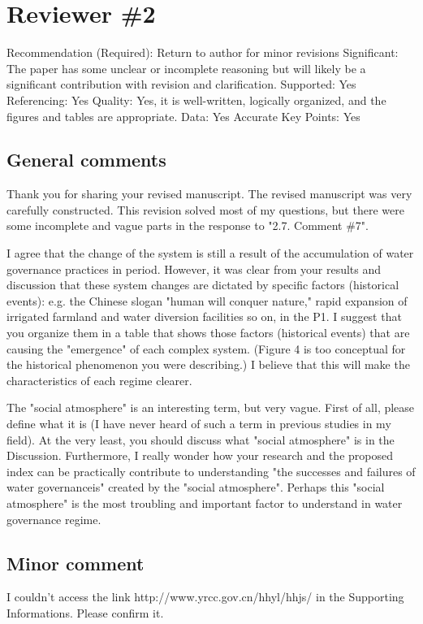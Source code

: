 \section{Reviewer \#2}\label{reviewer_2}

Recommendation (Required): Return to author for minor revisions
Significant: The paper has some unclear or incomplete reasoning but will likely be a significant contribution with revision and clarification.
Supported: Yes
Referencing: Yes
Quality: Yes, it is well-written, logically organized, and the figures and tables are appropriate.
Data: Yes
Accurate Key Points: Yes

\subsection*{General comments}

Thank you for sharing your revised manuscript. The revised manuscript was very carefully constructed. This revision solved most of my questions, but there were some incomplete and vague parts in the response to "2.7. Comment \#7".

I agree that the change of the system is still a result of the accumulation of water governance practices in period. However, it was clear from your results and discussion that these system changes are dictated by specific factors (historical events): e.g. the Chinese slogan "human will conquer nature," rapid expansion of irrigated farmland and water diversion facilities so on, in the P1. I suggest that you organize them in a table that shows those factors (historical events) that are causing the "emergence" of each complex system. (Figure 4 is too conceptual for the historical phenomenon you were describing.) I believe that this will make the characteristics of each regime clearer.

The "social atmosphere" is an interesting term, but very vague. First of all, please define what it is (I have never heard of such a term in previous studies in my field). At the very least, you should discuss what "social atmosphere" is in the Discussion. Furthermore, I really wonder how your research and the proposed index can be practically contribute to understanding "the successes and failures of water governanceis" created by the "social atmosphere". Perhaps this "social atmosphere" is the most troubling and important factor to understand in water governance regime.

\subsection*{Minor comment}

I couldn't access the link http://www.yrcc.gov.cn/hhyl/hhjs/ in the Supporting Informations. Please confirm it.
